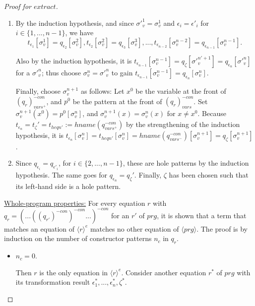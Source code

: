 \documentclass[11pt]{article} %
\begin{document}
\begin{proof}[Proof for $extract$]
\begin{itemize}
\begin{itemize}
\begin{enumerate}
\item By the induction hypothesis, and since $\sigma'^1_v = \sigma^1_v$ and $\epsilon_i = \epsilon'_i$ for $i \in \{1, ..., n-1\}$, we have
\begin{equation*}
t_{\epsilon_1}[\sigma^1_v] = q_{\epsilon_2}[\sigma^2_v], t_{\epsilon_2}[\sigma^2_v] = q_{\epsilon_3}[\sigma^3_v], ..., t_{\epsilon_{n-2}}[\sigma^{n-2}_v] = q_{\epsilon_{n-1}}[\sigma^{n-1}_v].
\end{equation*}

Also by the induction hypothesis, it is $t_{\epsilon_{n-1}}[\sigma^{n-1}_v] = q_\zeta[\sigma'^{n' +1}_v] = q_{\epsilon_n}[\sigma'^{n}_v]$ for a $\sigma'^{n}_v$; thus choose $\sigma^{n}_v = \sigma'^{n}_v$ to gain $t_{\epsilon_{n-1}}[\sigma^{n-1}_v] = q_{\epsilon_n}[\sigma^{n}_v]$.

Finally, choose $\sigma^{n+1}_v$ as follows: Let $x^0$ be the variable at the front of $(q_r)^{-con}_{vars^+}$, and $p^0$ be the pattern at the front of $(q_r)^{-con}_{vars}$. Set $\sigma^{n+1}_v(x^0) = p^0[\sigma^n_v]$, and $\sigma^{n+1}_v(x) = \sigma^n_v(x)$ for $x \neq x^0$. Because $t_{\epsilon_n} = t_\zeta' = t_{heqn'} := hname(q^{-con}_{vars^+})$ by the strengthening of the induction hypothesis, it is $t_{\epsilon_n}[\sigma^n_v] = t_{heqn'}[\sigma^n_v] = hname(q^{-con}_{vars^-})[\sigma^{n+1}_v] = q_\zeta[\sigma^{n+1}_v]$.

\item Since $q_{\epsilon_i} = q_{\epsilon'_i}$, for $i \in \{2, ..., n-1\}$, these are hole patterns by the induction hypothesis. The same goes for $q_{\epsilon_n} = q_\zeta'$. Finally, $\zeta$ has been chosen such that its left-hand side is a hole pattern.
\end{enumerate}

\end{itemize}

\end{itemize}

\underline{Whole-program properties:} For every equation $r$ with $q_r = (...((q_{r'})^{-con})^{-con}...)^{-con}$ for an $r'$ of $prg$, it is shown that a term that matches an equation of $\langle r \rangle^e$ matches no other equation of $\langle prg \rangle$. The proof is by induction on the number of constructor patterns $n_c$ in $q_r$.

\begin{itemize}

\item $n_c = 0$.

Then $r$ is the only equation in $\langle r \rangle^e$. Consider another equation $r^*$ of $prg$ with its transformation result $\epsilon^*_1, ..., \epsilon^*_n, \zeta^*$.


\end{itemize}
\end{proof}
\end{document}
